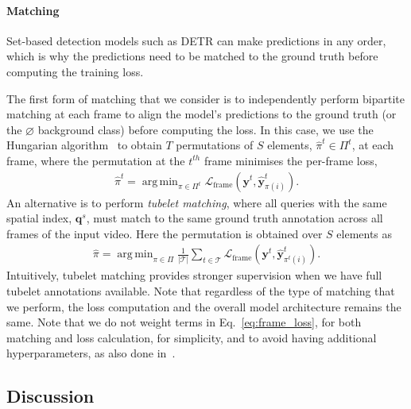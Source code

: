 \documentclass[10pt,twocolumn,letterpaper]{article}
\DeclareMathOperator*{\argmin}{arg\,min}
\begin{document}
\paragraph{Matching}
Set-based detection models such as DETR can make predictions in any order, which is why the predictions need to be matched to the ground truth before computing the training loss. 

The first form of matching that we consider is to independently perform bipartite matching at each frame to align the model's predictions to the ground truth (or the $\varnothing$ background class) before computing the loss.
In this case, we use the Hungarian algorithm~\cite{kuhn1955hungarian} to obtain $T$ permutations of $S$ elements, $\hat{\pi}^t \in \Pi^t$, at each frame, where the permutation at the $t^{th}$ frame minimises the per-frame loss,
\begin{align}
	\hat{\pi}^t = \argmin_{\pi \in \Pi^{t}} \mathcal{L}_{\text{frame}}(\mathbf{y}^t, \hat{\mathbf{y}}^t_{\pi(i)}).
\end{align}
An alternative is to perform \textit{tubelet matching}, where all queries with the same spatial index, $\mathbf{q}^s$, must match to the same ground truth annotation across all frames of the input video.
Here the permutation is obtained over $S$ elements as
\begin{align}
	\hat{\pi} = \argmin_{\pi \in \Pi} \frac{1}{|\mathcal{T}|}\sum_{t \in \mathcal{T}} \mathcal{L}_{\text{frame}}(\mathbf{y}^t, \hat{\mathbf{y}}^t_{\pi^{t}(i)}).
\end{align}
Intuitively, tubelet matching provides stronger supervision when we have full tubelet annotations available. Note that regardless of the type of matching that we perform, the loss computation and the overall model architecture remains the same.
Note that we do not weight terms in Eq.~\ref{eq:frame_loss}, for both matching and loss calculation, for simplicity, and to avoid having additional hyperparameters, as also done in~\cite{minderer2022simple}.


\subsection{Discussion}
\label{sec:method_discussion}
\end{document}
